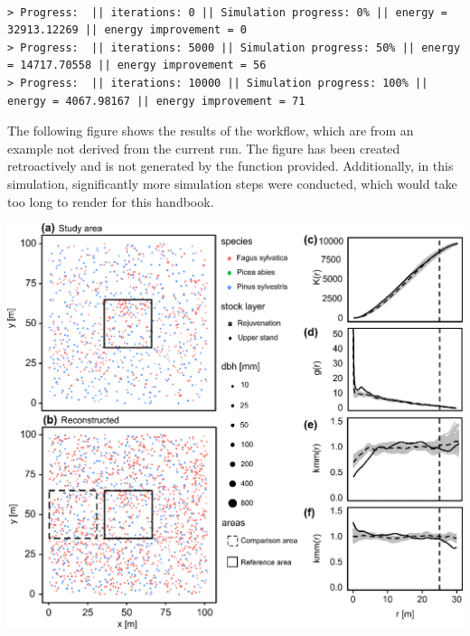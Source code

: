 \documentclass[
  letterpaper,
  DIV=11,
  numbers=noendperiod]{scrreprt}
\newenvironment{Shaded}{\begin{snugshade}}{\end{snugshade}}
\newcommand{\AttributeTok}[1]{\textcolor[rgb]{0.40,0.45,0.13}{#1}}
\newcommand{\ConstantTok}[1]{\textcolor[rgb]{0.56,0.35,0.01}{#1}}
\newcommand{\ControlFlowTok}[1]{\textcolor[rgb]{0.00,0.23,0.31}{\textbf{#1}}}
\newcommand{\DecValTok}[1]{\textcolor[rgb]{0.68,0.00,0.00}{#1}}
\newcommand{\FloatTok}[1]{\textcolor[rgb]{0.68,0.00,0.00}{#1}}
\newcommand{\NormalTok}[1]{\textcolor[rgb]{0.00,0.23,0.31}{#1}}
\newcommand{\SpecialCharTok}[1]{\textcolor[rgb]{0.37,0.37,0.37}{#1}}
\newcommand{\StringTok}[1]{\textcolor[rgb]{0.13,0.47,0.30}{#1}}
\begin{document}
\begin{Shaded}
\end{Shaded}

\begin{verbatim}

> Progress:  || iterations: 0 || Simulation progress: 0% || energy = 32913.12269 || energy improvement = 0
> Progress:  || iterations: 5000 || Simulation progress: 50% || energy = 14717.70558 || energy improvement = 56
> Progress:  || iterations: 10000 || Simulation progress: 100% || energy = 4067.98167 || energy improvement = 71
\end{verbatim}

The following figure shows the results of the workflow, which are from
an example not derived from the current run. The figure has been created
retroactively and is not generated by the function provided.
Additionally, in this simulation, significantly more simulation steps
were conducted, which would take too long to render for this handbook.

\includegraphics{images/results_TLS.png}
\end{document}
